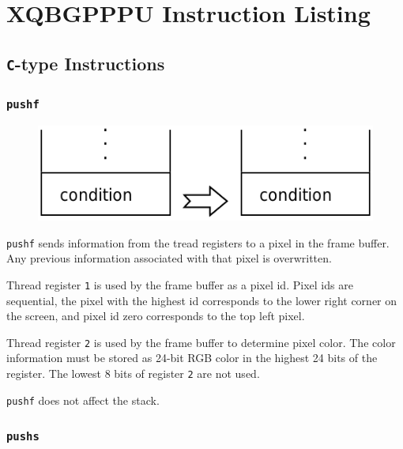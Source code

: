 \chapter{XQBGPPPU Instruction Listing}

\section{\texttt{C}-type Instructions}
	
	
	\subsection*{\texttt{pushf}}
	
		\begin{figure}
			\begin{flushright}
				\includegraphics[width=\linewidth]{figure/pdf/i_pushf} 
			\end{flushright}
		\end{figure}
	
			\texttt{pushf} sends information from the tread registers to a
			pixel in the frame buffer. Any previous information associated with
			that pixel is overwritten.
			
			Thread register \texttt{1} is used by the frame buffer as a pixel
			id. Pixel ids are sequential, the pixel with the highest id
			corresponds to the lower right corner on the screen, and pixel id
			zero corresponds to the top left pixel.

			Thread register \texttt{2} is used by the frame buffer to determine
			pixel color. The color information must be stored as 24-bit RGB 
			color in the highest 24 bits of the register. The lowest 8 bits of
			register \texttt{2} are not used.
			
			\texttt{pushf} does not affect the stack.
	
	\qquad

	\subsection*{\texttt{pushs}}
	
